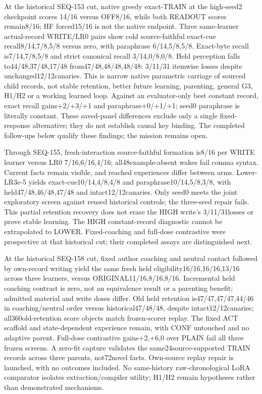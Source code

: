 \documentclass[11pt]{article}
\begin{document}
At the historical SEQ-153 cut, native greedy exact-TRAIN at the high-seed2 checkpoint scores
14/16 versus OFF8/16, while both READOUT scores remain8/16; HF forced15/16 is
not the native endpoint. Three same-learner actual-record WRITE/LR0 pairs show
cold source-faithful exact-cue recall8/14,7/8,5/8 versus zero, with paraphrase
6/14,5/8,5/8. Exact-byte recall is7/14,7/8,5/8 and strict canonical recall
3/14,0/8,0/8. Held perception falls to44/48,37/48,17/48 from47/48,48/48,48/48:
3/11/31 itemwise losses despite unchanged12/12canaries. This is narrow native
parametric carriage of sourced child records, not stable retention, better
future learning, parenting, general G3, H1/H2 or a working learned loop.
Against an evaluator-only best constant record, exact recall gains+2/+3/+1
and paraphrase+0/+1/+1; seed0 paraphrase is literally constant. These saved-panel
differences exclude only a single fixed-response alternative; they do not establish
causal key binding.
The completed follow-ups below qualify these findings; the mission remains open.

Through SEQ-155, fresh-interaction source-faithful formation is8/16 per WRITE
learner versus LR0 7/16,6/16,4/16; all48example-absent wakes fail comma syntax.
Current facts remain visible, and reached experiences differ between arms.
Lower-LR3e-5 yields exact-cue10/14,4/8,4/8 and paraphrase10/14,5/8,3/8,
with held47/48,46/48,47/48 and intact12/12canaries. Only seed0 meets the
joint exploratory screen against reused historical controls; the three-seed
repair fails. This partial retention recovery does not erase the HIGH write's
3/11/31losses or prove stable learning. The HIGH constant-record diagnostic
cannot be extrapolated to LOWER. Fixed-coaching and full-dose contrastive were
prospective at that historical cut; their completed assays are distinguished next.

At the historical SEQ-158 cut, fixed author coaching and neutral contact followed by own-record
writing yield the same fresh held eligibility16/16,16/16,13/16 across three
learners, versus ORIGINAL11/16,8/16,8/16. Incremental held coaching contrast is zero, not
an equivalence result or a parenting benefit; admitted material and write doses
differ. Old held retention is47/47,47/47,44/46 in coaching/neutral order versus
historical47/48/48, despite intact12/12canaries; all360old-retention score
objects match frozen-scorer replay. The fixed ACT scaffold and state-dependent
experience remain, with CONF untouched and no adaptive parent. Full-dose
contrastive gains+2,+6,0 over PLAIN fail all three frozen screens. A zero-fit
capture validates the same24source-supported TRAIN records across three parents,
not72novel facts. Own-source replay repair is launched, with no outcomes included.
No same-history raw-chronological LoRA comparator isolates extraction/compiler
utility; H1/H2 remain hypotheses rather than demonstrated mechanisms.
\end{document}
